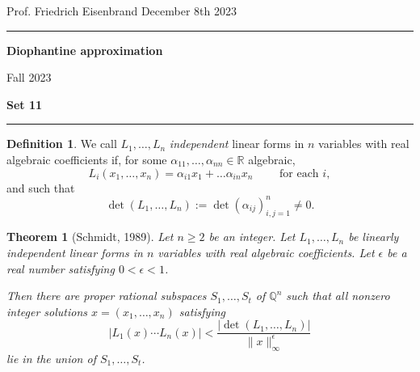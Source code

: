 \documentclass[12pt,a4paper]{article}
\date{}
\theoremstyle{plain}
\newtheorem{theorem}{Theorem}
\newtheorem*{Sol*}{Solution}
\theoremstyle{definition}
\newtheorem{Ex}{Exercise}
\newtheorem{definition}{Definition}
\def \Q {\mathbb Q}
\def \R {\mathbb R}
\newif\ifsolutions
\newcommand{\exercise}[2]{
			\begin{Ex} #1 \end{Ex}
			\ifsolutions  \begin{Sol*} #2 \end{Sol*} \bigskip \else \bigskip  \fi
		}
\begin{document}
\begin{center}
{Prof. Friedrich Eisenbrand \hfill December 8th 2023}
\end{center}
	
\hrule\vspace{\baselineskip}

\begin{center}
\textbf{Diophantine approximation}

Fall 2023

\bigskip

\textbf{Set 11}
\ifsolutions{\textbf{- Solutions}} \else{} \fi
\end{center}

\hrule\vspace{\baselineskip}




\begin{definition}
	We call $L_1, \dots, L_n$ \emph{independent} linear forms in $n$ variables with real algebraic coefficients if, for some $\alpha_{11}, \dots, \alpha_{nn} \in \R$ algebraic,
		\[ L_i(x_1, \dots, x_n) = \alpha_{i1} x_1 + \dots \alpha_{in} x_n \qquad \text{ for each $i$},\]
	and such that
		\[ \det(L_1, \dots, L_n) := \det \left( \alpha_{ij} \right)_{i,j=1}^n \neq 0. \]
	
\end{definition}

\begin{theorem}[Schmidt, 1989]

	Let $n \geq 2$ be an integer.
	Let $L_1, \dots, L_n$ be linearly independent linear forms in $n$ variables with real algebraic coefficients.
	Let $\epsilon$ be a real number satisfying $0 < \epsilon < 1$.

	Then there are proper rational subspaces $S_1, \dots, S_t$ of $\Q^n$
	such that all nonzero integer solutions $x = (x_1, \dots, x_n)$ satisfying 
		\[ \left| L_1(x) \cdots L_n(x) \right| < \frac{ \left| \det(L_1, \dots, L_n) \right|  }{\| x\|_\infty^{\epsilon}} \]
	lie in the union of $S_1, \dots, S_t$.

\end{theorem}
\end{document}
